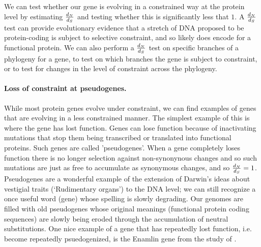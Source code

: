 We can test whether our gene is evolving in a constrained way at the protein level by estimating $\frac{d_N}{d_S}$ and testing whether this is significantly less that  $1$. A $\frac{d_N}{d_S}$ test can provide evolutionary evidence that a stretch of DNA proposed to be protein-coding is subject to selective constraint, and so likely does encode for a functional protein. We can also perform a $\frac{d_N}{d_S}$ test on specific branches of a phylogeny for a gene, to test on which branches the gene is subject to constraint, or to test for changes in the level of constraint across the phylogeny.


\paragraph{Loss of constraint at pseudogenes.}



While most protein genes evolve under constraint, we can find examples of
genes that are evolving in a less constrained manner. The simplest
example of this is where the gene has lost function. Genes can lose function because of inactivating mutations that stop them being transcribed or translated into functional proteins. Such genes are called 'pseudogenes'. When a gene completely loses function there is no longer
selection against non-synonynous changes and so such mutations are just as free
to accumulate as synonymous changes, and so $\frac{d_N}{d_S}=1$.
Pseudogenes are a wonderful example of the extension of Darwin's ideas about vestigial traits (`Rudimentary organs') to the DNA level;
we can still recognize a once useful word (gene) whose spelling is slowly degrading. Our genomes are filled with old pseudogenes whose
original meanings (functional protein coding sequences) are slowly being eroded through the accumulation of neutral substitutions.
One nice example of a gene that has repeatedly lost function,
i.e. become repeatedly psuedogenized, is
the Enamlin gene from the study of \citet{Meredith:09}.


